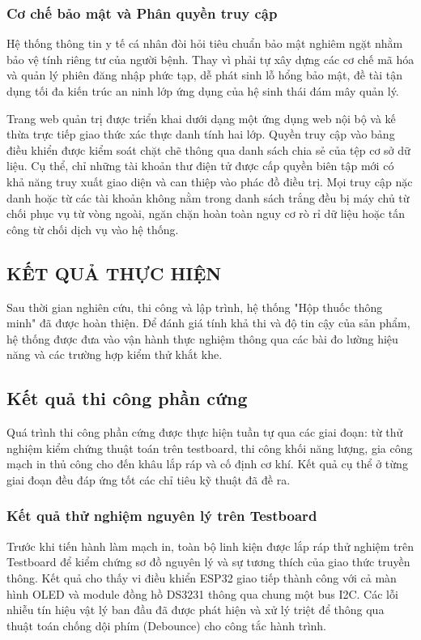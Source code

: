 \documentclass[12pt, a4paper, oneside]{article}
\begin{document}
\subsubsection{Cơ chế bảo mật và Phân quyền truy cập}
Hệ thống thông tin y tế cá nhân đòi hỏi tiêu chuẩn bảo mật nghiêm ngặt nhằm bảo vệ tính riêng tư của người bệnh. Thay vì phải tự xây dựng các cơ chế mã hóa và quản lý phiên đăng nhập phức tạp, dễ phát sinh lỗ hổng bảo mật, đề tài tận dụng tối đa kiến trúc an ninh lớp ứng dụng của hệ sinh thái đám mây quản lý.

Trang web quản trị được triển khai dưới dạng một ứng dụng web nội bộ và kế thừa trực tiếp giao thức xác thực danh tính hai lớp. Quyền truy cập vào bảng điều khiển được kiểm soát chặt chẽ thông qua danh sách chia sẻ của tệp cơ sở dữ liệu. Cụ thể, chỉ những tài khoản thư điện tử được cấp quyền biên tập mới có khả năng truy xuất giao diện và can thiệp vào phác đồ điều trị. Mọi truy cập nặc danh hoặc từ các tài khoản không nằm trong danh sách trắng đều bị máy chủ từ chối phục vụ từ vòng ngoài, ngăn chặn hoàn toàn nguy cơ rò rỉ dữ liệu hoặc tấn công từ chối dịch vụ vào hệ thống.

\newpage
\begin{center}
    \section{KẾT QUẢ THỰC HIỆN}
\end{center}

Sau thời gian nghiên cứu, thi công và lập trình, hệ thống "Hộp thuốc thông minh" đã được hoàn thiện. Để đánh giá tính khả thi và độ tin cậy của sản phẩm, hệ thống được đưa vào vận hành thực nghiệm thông qua các bài đo lường hiệu năng và các trường hợp kiểm thử khắt khe.

\subsection{Kết quả thi công phần cứng}
Quá trình thi công phần cứng được thực hiện tuần tự qua các giai đoạn: từ thử nghiệm kiểm chứng thuật toán trên testboard, thi công khối năng lượng, gia công mạch in thủ công cho đến khâu lắp ráp và cố định cơ khí. Kết quả cụ thể ở từng giai đoạn đều đáp ứng tốt các chỉ tiêu kỹ thuật đã đề ra.

\subsubsection{Kết quả thử nghiệm nguyên lý trên Testboard}
Trước khi tiến hành làm mạch in, toàn bộ linh kiện được lắp ráp thử nghiệm trên Testboard để kiểm chứng sơ đồ nguyên lý và sự tương thích của giao thức truyền thông. Kết quả cho thấy vi điều khiển ESP32 giao tiếp thành công với cả màn hình OLED và module đồng hồ DS3231 thông qua chung một bus I2C. Các lỗi nhiễu tín hiệu vật lý ban đầu đã được phát hiện và xử lý triệt để thông qua thuật toán chống dội phím (Debounce) cho công tắc hành trình.
\end{document}
